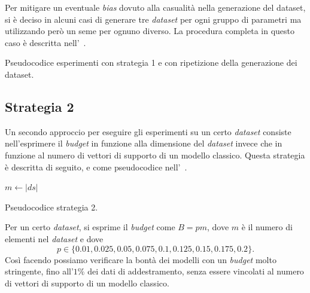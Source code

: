 Per mitigare un eventuale \emph{bias} dovuto alla casualità nella generazione del dataset, si è deciso in alcuni casi di generare tre \emph{dataset} per ogni gruppo di parametri ma utilizzando però un seme per ognuno diverso.
La procedura completa in questo caso è descritta nell'~.
\begin{algorithm}
    \SetAlgoLined
\caption{Pseudocodice esperimenti con strategia 1 e con ripetizione della generazione dei dataset.}
\label{alg:esperimenti_2}
\end{algorithm}

\subsection{Strategia 2}
Un secondo approccio per eseguire gli esperimenti su un certo \emph{dataset} consiste nell'esprimere il \emph{budget} in funzione alla dimensione del \emph{dataset} invece che in funzione al numero di vettori di supporto di un modello classico.
Questa strategia è descritta di seguito, e come pseudocodice nell'~.
\begin{algorithm}
    \SetAlgoLined
    $m \gets |ds|$\;
\caption{Pseudocodice strategia 2.}
\label{alg:esperimenti_3}
\end{algorithm}

Per un certo \emph{dataset}, si esprime il \emph{budget} come $B=pm$, dove $m$ è il numero di elementi nel \emph{dataset} e dove
\begin{equation*}
    p\in\{0.01, 0.025, 0.05, 0.075, 0.1, 0.125, 0.15, 0.175, 0.2\}.
\end{equation*}
Così facendo possiamo verificare la bontà dei modelli con un \emph{budget} molto stringente, fino all'$1\%$ dei dati di addestramento, senza essere vincolati al numero di vettori di supporto di un modello classico.

